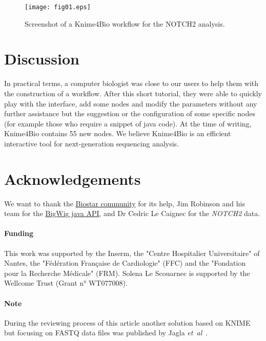 \documentclass{bioinfo}
\begin{document}
\begin{figure}[!tpb]%
\centerline{\texttt{[image: fig01.eps]}}
\caption{Screenshot of a Knime4Bio workflow for the NOTCH2 analysis.}\label{fig:x1}
\end{figure}

\section{Discussion}
In practical terms, a computer biologist was close to our users to help them with the construction of a workflow. After this short tutorial, they were able to quickly play with the interface, add some nodes and modify the parameters without any further assistance but the suggestion or the configuration of some specific nodes (for example those who require a snippet of java code).  At the time of writing, Knime4Bio contains 55 new nodes. We believe Knime4Bio is an efficient interactive tool for next-generation sequencing analysis.

\section*{Acknowledgements}
We want to thank the  \href{http://biostar.stackexchange.com/}{Biostar community} for its help, Jim Robinson and his team for the \href{http://code.google.com/p/bigwig/}{BigWig java API}, and Dr Cedric Le Caignec for the \textit{NOTCH2} data.

\paragraph{Funding\textcolon} This work was supported by the Inserm, the "Centre Hospitalier Universitaire" of Nantes, the "F\'{e}d\'{e}ration Fran\c{c}aise de Cardiologie" (FFC) and the "Fondation pour la Recherche M\'{e}dicale" (FRM). Solena Le Scouarnec is supported by the Wellcome Trust (Grant n° WT077008).

\paragraph{Note\textcolon} During the reviewing process of this article another solution based on KNIME but focusing on FASTQ data files was published by Jagla \textit{et~al}~\citep{pmid21873641}.
\\


\end{document}
